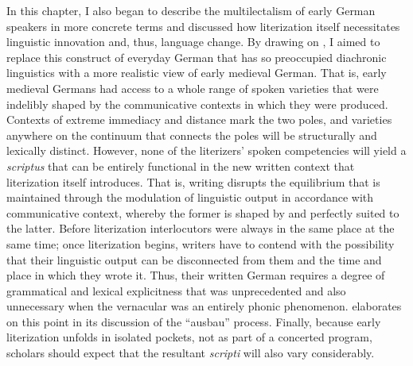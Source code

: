 In this chapter, I also began to describe the multilectalism of early German speakers in more concrete terms and discussed how literization itself necessitates linguistic innovation and, thus, language change. By drawing on \citet{KochOesterreicher1985}, I aimed to replace this construct of everyday German that has so preoccupied diachronic linguistics with a more realistic view of early medieval German. That is, early medieval Germans had access to a whole range of spoken varieties that were indelibly shaped by the communicative contexts in which they were produced. Contexts of extreme immediacy and distance mark the two poles, and varieties anywhere on the continuum that connects the poles will be structurally and lexically distinct. However, none of the literizers’ spoken competencies will yield a \textit{scriptus} that can be entirely functional in the new written context that literization itself introduces. That is, writing disrupts the equilibrium that is maintained through the modulation of linguistic output in accordance with communicative context, whereby the former is shaped by and perfectly suited to the latter. Before literization interlocutors were always in the same place at the same time; once literization begins, writers have to contend with the possibility that their linguistic output can be disconnected from them and the time and place in which they wrote it. Thus, their written German requires a degree of grammatical and lexical explicitness that was unprecedented and also unnecessary when the vernacular was an entirely phonic phenomenon.  elaborates on this point in its discussion of the “ausbau” process. Finally, because early literization unfolds in isolated pockets, not as part of a concerted program, scholars should expect that the resultant \textit{scripti} will also vary considerably.

